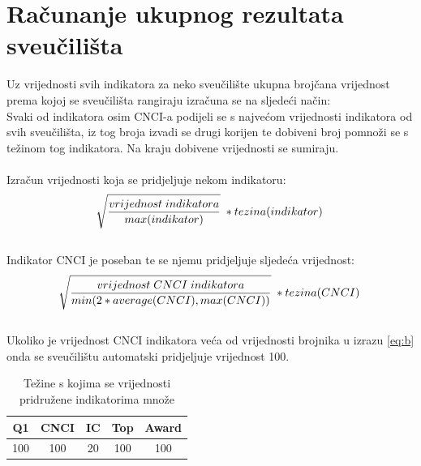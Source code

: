\documentclass[times, utf8, zavrsni]{fer}
\begin{document}
\section{Računanje ukupnog rezultata sveučilišta}
Uz vrijednosti svih indikatora za neko sveučilište ukupna brojčana vrijednost prema kojoj se sveučilišta rangiraju izračuna 
se na sljedeći način:
\\Svaki od indikatora osim CNCI-a podijeli se s najvećom vrijednosti indikatora od svih sveučilišta, iz tog broja izvadi se
drugi korijen te dobiveni broj pomnoži se s težinom tog indikatora.
Na kraju dobivene vrijednosti se sumiraju.
\\
\\ Izračun vrijednosti koja se pridjeljuje nekom indikatoru: 
\begin{align}
    \sqrt[\leftroot{-2}]{\frac{vrijednost \; indikatora}{max(indikator)}} \; * tezina(indikator) \label{eq:a}
\end{align}
\\ Indikator CNCI je poseban te se njemu pridjeljuje sljedeća vrijednost: \\ 
\begin{align}
    \sqrt[\leftroot{-2}]{\frac{vrijednost \; CNCI \; indikatora}{min(2*average(CNCI), max(CNCI))}} \; * tezina(CNCI) \label{eq:b}
    \end{align}
\\ Ukoliko je vrijednost CNCI indikatora veća od vrijednosti brojnika u izrazu \ref{eq:b} onda se sveučilištu automatski pridjeljuje vrijednost 100.

\begin{table}[htb]
    \caption{Težine s kojima se vrijednosti pridružene indikatorima množe}
        \label{tbl:konstante3}
        \centering
        \begin{tabular}{ccccc} \hline
        Q1 & CNCI & IC & Top & Award \\ \hline
        100&100&20&100&100\\
        \end{tabular}
        \end{table}    
        \FloatBarrier
\end{document}
